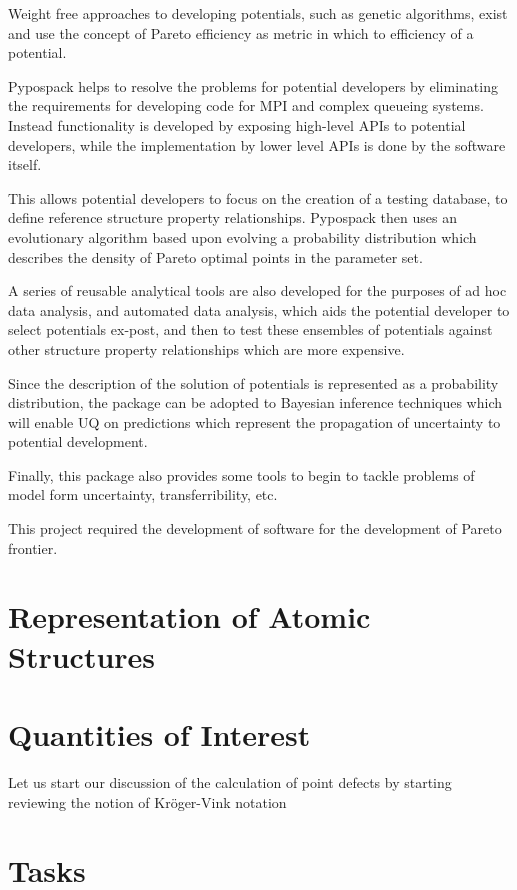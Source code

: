 Weight free approaches to developing potentials, such as genetic algorithms, exist and use the concept of Pareto efficiency as metric in which to efficiency of a potential.

Pypospack helps to resolve the problems for potential developers by eliminating the requirements for developing code for MPI and complex queueing systems.  Instead functionality is developed by exposing high-level APIs to potential developers, while the implementation by lower level APIs is done by the software itself.

This allows potential developers to focus on the creation of a testing database, to define reference structure property relationships.  Pypospack then uses an evolutionary algorithm based upon evolving a probability distribution which describes the density of Pareto optimal points in the parameter set.

A series of reusable analytical tools are also developed for the purposes of ad hoc data analysis, and automated data analysis, which aids the potential developer to select potentials ex-post, and then to test these ensembles of potentials against other structure property relationships which are more expensive.

Since the description of the solution of potentials is represented as a probability distribution, the package can be adopted to Bayesian inference techniques which will enable UQ on predictions which represent the propagation of uncertainty to potential development.

Finally, this package also provides some tools to begin to tackle problems of model form uncertainty, transferribility, etc.

This project required the development of software for the development of Pareto frontier.

\section{Representation of Atomic Structures}


\section{Quantities of Interest}

Let us start our discussion of the calculation of point defects by starting reviewing the notion of Kr\"oger-Vink notation\cite{kroger1956_notation}

\section{Tasks}

